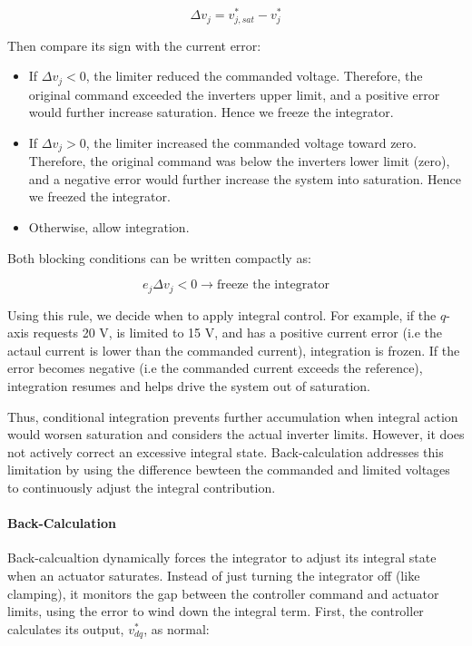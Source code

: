 \documentclass{article}
\begin{document}
\begin{equation}
    \Delta v_j = v_{j,sat}^* - v_j^*
\end{equation}

Then compare its sign with the current error:

\begin{itemize}
    \item If $\Delta v_j < 0$, the limiter reduced the commanded voltage. Therefore, the original command exceeded the inverters upper limit, and a positive error would further increase saturation. Hence we freeze the integrator.
    \item If $\Delta v_j > 0$, the limiter increased the commanded voltage toward zero. Therefore, the original command was below the inverters lower limit (zero), and a negative error would further increase the system into saturation. Hence we freezed the integrator.
    \item Otherwise, allow integration.
\end{itemize}

Both blocking conditions can be written compactly as:

\[
    e_j\Delta v_j < 0 \rightarrow \text{freeze the integrator}
\]

Using this rule, we decide when to apply integral control. For example, if the $q$-axis requests 20 V, is limited to 15 V, and has a positive current error (i.e the actaul current is lower than the commanded current), integration is frozen. If the error becomes negative (i.e the commanded current exceeds the reference), integration resumes and helps drive the system out of saturation.

Thus, conditional integration prevents further accumulation when integral action would worsen saturation and considers the actual inverter limits. However, it does not actively correct an excessive integral state. Back-calculation addresses this limitation by using the difference bewteen the commanded and limited voltages to continuously adjust the integral contribution.


\paragraph{Back-Calculation}

Back-calcualtion dynamically forces the integrator to adjust its integral state when an actuator saturates. Instead of just turning the integrator off (like clamping), it monitors the gap between the controller command and actuator limits, using the error to wind down the integral term. First, the controller calculates its output, $v_{dq}^*$, as normal:
\end{document}
